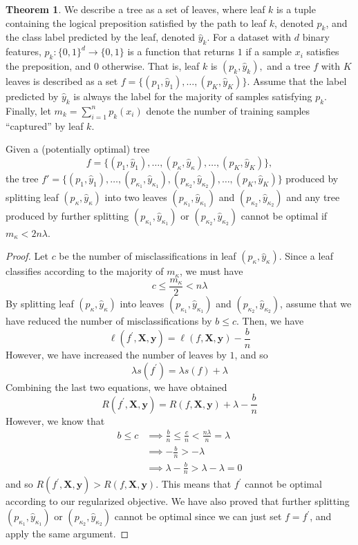 \documentclass{article}
\theoremstyle{definition}
\newtheorem{theorem}{Theorem}[section]
\begin{document}
  \begin{theorem}
  We describe a tree as a set of leaves, where leaf $k$ is a tuple containing the logical preposition satisfied by the path to leaf $k$, denoted $p_k $, and the class label predicted by the leaf, denoted $\hat{y}_k$. For a dataset with $d$ binary features, $p_k: \{0, 1\}^d \to \{0, 1\}$ is a function that returns $1$ if a sample $x_i$ satisfies the preposition, and $0$ otherwise. That is, leaf $k$ is $(p_k, \hat{y}_k),$ and a tree $f$ with $K$ leaves is described as a set $f = \{(p_1, \hat{y}_1), \hdots, (p_K, \hat{y}_K)\}$. Assume that the label predicted by $\hat{y}_k$ is always the label for the majority of samples satisfying $p_k$. Finally, let $m_k = \sum_{i=1}^n p_k(x_i)$ denote the number of training samples ``captured'' by leaf $k$.

  Given a (potentially optimal) tree $$f = \{(p_1, \hat{y}_1), \hdots, (p_{\kappa}, \hat{y}_{\kappa}), \hdots, (p_K, \hat{y}_K)\},$$ 
  the tree $f' = \{(p_1, \hat{y}_1), \hdots, (p_{\kappa_1}, \hat{y}_{\kappa_1}), (p_{\kappa_2}, \hat{y}_{\kappa_2}), \hdots, (p_K, \hat{y}_K)\}$ 
  produced by splitting leaf $(p_{\kappa}, \hat{y}_{\kappa})$ into two leaves $(p_{\kappa_1}, \hat{y}_{\kappa_1})$ and $(p_{\kappa_2}, \hat{y}_{\kappa_2})$ and any tree produced by further splitting $(p_{\kappa_1}, \hat{y}_{\kappa_1})$ or $(p_{\kappa_2}, \hat{y}_{\kappa_2})$ cannot  be optimal if $m_{\kappa} < 2n\lambda$.
  \end{theorem}
  \begin{proof}
  Let $c$ be the number of misclassifications in leaf $(p_{\kappa}, \hat{y}_{\kappa})$. Since a leaf classifies according to the majority of $m_{\kappa}$, we must have 
  \[c \leq \frac{m_\kappa}{2} < n \lambda\]
  By splitting leaf $(p_\kappa, \hat{y}_\kappa)$ into leaves $(p_{\kappa_1}, \hat{y}_{\kappa_1})$ and $(p_{\kappa_2}, \hat{y}_{\kappa_2})$, assume that we have reduced the number of misclassifications by $b \leq c$. Then, we have 
  \[\ell(f^\prime, \mathbf{X}, \mathbf{y}) = \ell(f, \mathbf{X}, \mathbf{y}) - \frac{b}{n}\]
  However, we have increased the number of leaves by $1$, and so 
  \[\lambda s(f^\prime) = \lambda s(f) + \lambda\]
  Combining the last two equations, we have obtained 
  \[R (f^\prime, \mathbf{X}, \mathbf{y}) = R(f, \mathbf{X}, \mathbf{y}) + \lambda - \frac{b}{n}\]
  However, we know that 
  \begin{align*}
      b \leq c & \implies \frac{b}{n} \leq \frac{c}{n} < \frac{n \lambda}{n} = \lambda \\
      & \implies - \frac{b}{n} > - \lambda \\
      & \implies \lambda - \frac{b}{n} > \lambda - \lambda = 0
  \end{align*}
  and so $R (f^\prime, \mathbf{X}, \mathbf{y}) > R(f, \mathbf{X}, \mathbf{y})$. This means that $f^\prime$ cannot be optimal according to our regularized objective. We have also proved that further splitting $(p_{\kappa_1}, \hat{y}_{\kappa_1})$ or $(p_{\kappa_2}, \hat{y}_{\kappa_2})$ cannot  be optimal since we can just set $f = f^\prime$, and apply the same argument. 
  \end{proof}
\end{document}
